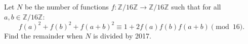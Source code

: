 Let $N$ be the number of functions $f: \mathbb{Z}/16\mathbb{Z} \to \mathbb{Z}/16\mathbb{Z}$ such that for all $a,b \in \mathbb{Z}/16\mathbb{Z}$: \[f(a)^2+f(b)^2+f(a+b)^2 \equiv 1+2f(a)f(b)f(a+b) \pmod{16}.\] Find the remainder when $N$ is divided by 2017.
